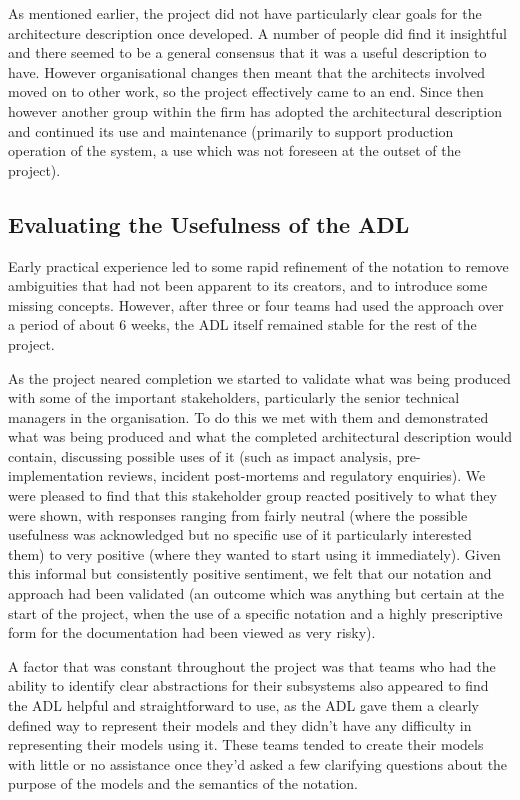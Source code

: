   As mentioned earlier, the project did not have particularly clear goals for the architecture description once developed.  A number of people did find it insightful and there seemed to be a general consensus that it was a useful description to have.  However organisational changes then meant that the architects involved moved on to other work, so the project effectively came to an end.  Since then however another group within the firm has adopted the architectural description and continued its use and maintenance (primarily to support production operation of the system, a use which was not foreseen at the outset of the project).

\subsection{Evaluating the Usefulness of the ADL}

  Early practical experience led to some rapid refinement of the notation to remove ambiguities that had not been apparent to its creators, and to introduce some missing concepts.  However, after three or four teams had used the approach over a period of about 6 weeks, the ADL itself remained stable for the rest of the project.

  As the project neared completion we started to validate what was being produced with some of the important stakeholders, particularly the senior technical managers in the organisation.  To do this we met with them and demonstrated what was being produced and what the completed architectural description would contain, discussing possible uses of it (such as impact analysis, pre-implementation reviews, incident post-mortems and regulatory enquiries).  We were pleased to find that this stakeholder group reacted positively to what they were shown, with responses ranging from fairly neutral (where the possible usefulness was acknowledged but no specific use of it particularly interested them) to very positive (where they wanted to start using it immediately).  Given this informal but consistently positive sentiment, we felt that our notation and approach had been validated (an outcome which was anything but certain at the start of the project, when the use of a specific notation and a highly prescriptive form for the documentation had been viewed as very risky). 

  A factor that was constant throughout the project was that teams who had the ability to identify clear abstractions for their subsystems also appeared to find the ADL helpful and straightforward to use, as the ADL gave them a clearly defined way to represent their models and they didn't have any difficulty in representing their models using it.  These teams tended to create their models with little or no assistance once they'd asked a few clarifying questions about the purpose of the models and the semantics of the notation.

